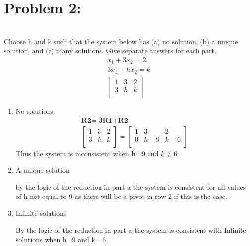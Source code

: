 \documentclass[12pt,a4paper]{article}
\begin{document}
\section{Problem 2:}\\
Choose h and k such that the system below has (a) no solution, (b) a unique solution,
and (c) many solutions. Give separate answers for each part.
\begin{align*}
  x_1 + 3x_2 = 2\\
3x_1 + hx_2 = k\\
\begin{bmatrix}
1 & 3 & 2 \\
3 & h & k \\
\end{bmatrix}
\end{align*}
\begin{enumerate}[label=(\alph*)]
\item No  solutions:
\begin{align*}
  \textbf{R2=-3R1+R2}\\
  \begin{bmatrix}
  1 & 3 & 2 \\
  3 & h & k \\
  \end{bmatrix}  =
  \begin{bmatrix}
  1 & 3 & 2 \\
  0 & h-9 & k-6 \\
  \end{bmatrix}
\end{align*}
Thus the system is inconsistent when $\textbf{h=9}$ and $k \neq 6$
\item A unique solution
\begin{center}
  by the logic of the reduction in part a the system is consistent for all values of h not equal to 9 as there will be a pivot in row 2 if this is the case.
\end{center}
\item Infinite solutions
\begin{center}
  By the logic of the reduction in part a the system is consistent with Infinite solutions when h=9 and k =6.
\end{center}
\end{enumerate}
\end{document}
